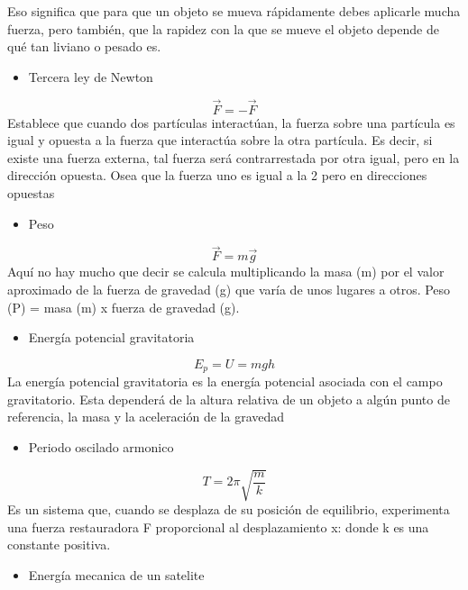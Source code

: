 \documentclass[4apaper, 12pt]{article}
\begin{document}
    Eso significa que para que un objeto se mueva rápidamente debes aplicarle mucha fuerza, pero también,  que la rapidez con la que se mueve el objeto depende de qué tan liviano o pesado es. 
    \begin{itemize}
        \item {Tercera ley de Newton}
    \end{itemize}
    \begin{equation}
        \vec {F}=-\vec {F}
    \end{equation}
    Establece que cuando dos partículas interactúan, la fuerza sobre una partícula es igual y opuesta a la fuerza que interactúa sobre la otra partícula. Es decir, si existe una fuerza externa, tal fuerza será contrarrestada por otra igual, pero en la dirección opuesta. Osea que la fuerza uno es igual a la 2 pero en direcciones opuestas
    \begin{itemize}
        \item [\clubsuit] {Peso}
    \end{itemize}
    \begin{equation}
        \vec{F}=m\vec{g}
    \end{equation}
    Aquí no hay mucho que decir se calcula multiplicando la masa (m) por el valor aproximado de la fuerza de gravedad (g) que varía de unos lugares a otros. Peso (P) = masa (m) x fuerza de gravedad (g).
    \begin{itemize}
        \item [\checkmark] {Energía potencial gravitatoria}
    \end{itemize}
    \begin{equation}
        E_p=U=mgh
    \end{equation}
    La energía potencial gravitatoria es la energía potencial asociada con el campo gravitatorio. Esta dependerá de la altura relativa de un objeto a algún punto de referencia, la masa y la aceleración de la gravedad
    \begin{itemize}
        \item[\heartsuit]{Periodo oscilado armonico}
    \end{itemize}
    \begin{equation}
        T=2\pi\sqrt{\dfrac{m}{k}}
    \end{equation}
    Es un sistema que, cuando se desplaza de su posición de equilibrio, experimenta una fuerza restauradora F proporcional al desplazamiento x: donde k es una constante positiva.
    \begin{itemize}
        \item [\clubsuit] {Energía mecanica de un satelite}
    \end{itemize}
\end{document}
